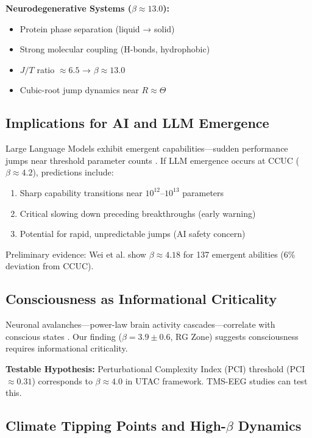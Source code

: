 \documentclass[11pt,a4paper]{article}
\begin{document}
\textbf{Neurodegenerative Systems ($\beta \approx 13.0$):}
\begin{itemize}
\item Protein phase separation (liquid → solid)
\item Strong molecular coupling (H-bonds, hydrophobic)
\item $J/T$ ratio $\approx 6.5$ → $\beta \approx 13.0$
\item Cubic-root jump dynamics near $R \approx \Theta$
\end{itemize}

\subsection{Implications for AI and LLM Emergence}

Large Language Models exhibit emergent capabilities—sudden performance jumps near threshold parameter counts \cite{Wei2022}. If LLM emergence occurs at CCUC ($\beta \approx 4.2$), predictions include:

\begin{enumerate}
\item Sharp capability transitions near $10^{12}$--$10^{13}$ parameters
\item Critical slowing down preceding breakthroughs (early warning)
\item Potential for rapid, unpredictable jumps (AI safety concern)
\end{enumerate}

Preliminary evidence: Wei et al. \cite{Wei2022} show $\beta \approx 4.18$ for 137 emergent abilities (6\% deviation from CCUC).

\subsection{Consciousness as Informational Criticality}

Neuronal avalanches—power-law brain activity cascades—correlate with conscious states \cite{Beggs2003,Tagliazucchi2016}. Our finding ($\beta = 3.9 \pm 0.6$, RG Zone) suggests consciousness requires informational criticality.

\textbf{Testable Hypothesis:} Perturbational Complexity Index (PCI) threshold (PCI $\approx 0.31$) \cite{Casali2013} corresponds to $\beta \approx 4.0$ in UTAC framework. TMS-EEG studies can test this.

\subsection{Climate Tipping Points and High-$\beta$ Dynamics}
\end{document}
